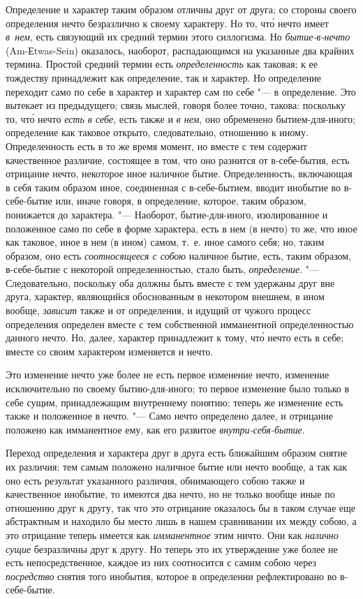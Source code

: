 Определение и характер таким образом отличны друг от друга; со стороны
своего определения нечто безразлично к своему характеру. Но то, чт\'{о} нечто
имеет {\em в~нем}, есть связующий их средний термин
этого силлогизма. Но {\em бытие-в-нечто}
(Am-Еtwas-Sein) оказалось, наоборот, распадающимся на указанные два крайних
термина. Простой средний термин есть
{\em определенность} как таковая; к ее тождеству
принадлежит как определение, так и характер. Но определение переходит само
по себе в характер и характер сам по себе "--- в определение. Это вытекает из
предыдущего; связь мыслей, говоря более точно, такова: поскольку то, чт\'{о}
нечто {\em есть в себе}, есть также и
{\em в нем}, оно обременено бытием-для-иного;
определение как таковое открыто, следовательно, отношению к иному.
Определенность есть в то же время момент, но вместе с тем содержит
качественное различие, состоящее в том, что оно разнится от в-себе-бытия,
есть отрицание нечто, некоторое иное наличное бытие. Определенность,
включающая в себя таким образом иное, соединенная с в-себе-бытием, вводит
инобытие во в-себе-бытие или, иначе говоря, в определение, которое, таким
образом, понижается до характера. "--- Наоборот, бытие-для-иного,
изолированное и положенное само по себе в форме характера, есть в нем (в
нечто) то же, что иное как таковое, иное в нем (в ином) самом, т.~е.
иное самого себя; но, таким образом, оно есть
{\em соотносящееся с собою} наличное бытие, есть, таким
образом, в-себе-бытие с некоторой определенностью, стало быть,
{\em определение}. "--- Следовательно, поскольку оба
должны быть вместе с тем удержаны друг вне друга, характер, являющийся
обоснованным в некотором внешнем, в ином вообще,
{\em зависит} также и от определения, и идущий от
чужого процесс определения определен вместе с тем собственной имманентной
определенностью данного нечто. Но, далее, характер принадлежит к тому, чт\'{о}
нечто есть в себе; вместе со своим характером изменяется и нечто.

Это изменение нечто уже более не есть первое изменение нечто, изменение
исключительно по своему бытию-для-иного; то первое изменение было только
в себе сущим, принадлежащим внутреннему понятию; теперь же изменение есть
также и положенное в нечто. "--- Само нечто определено далее, и отрицание
положено как имманентное ему, как его развитое
{\em внутри-себя-бытие}.

Переход определения и характера друг в друга есть ближайшим образом снятие
их различия; тем самым положено наличное бытие или нечто вообще, а так как
оно есть результат указанного различия, обнимающего собою также и
качественное инобытие, то имеются два нечто, но не только вообще иные по
отношению друг к другу, так что это отрицание оказалось бы в таком случае
еще абстрактным и находило бы место лишь в нашем сравнивании их между
собою, а это отрицание теперь имеется как
{\em имманентное} этим ничто. Они как
{\em налично сущие} безразличны друг к другу. Но теперь
это их утверждение уже более не есть непосредственное, каждое из них
соотносится с самим собою через {\em посредство} снятия
того инобытия, которое в определении рефлектировано во в-себе-бытие.

